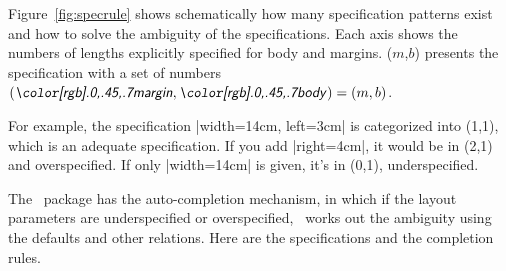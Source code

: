  Figure~\ref{fig:specrule} shows schematically how many specification
 patterns exist and how to solve the ambiguity of the
 specifications. Each axis shows the numbers of lengths
 explicitly specified for body and margins. \Ss($m$,$b$) presents the
 specification with a set of numbers $(\gpart{margin},\gpart{body})=(m,b)$.

 For example, the specification |width=14cm, left=3cm| is categorized
 into \Ss(1,1), which is an adequate specification. If you add
 |right=4cm|, it would be in \Ss(2,1) and overspecified. 
 If only |width=14cm| is given, it's in \Ss(0,1), underspecified. 

 The \Gm\ package has the auto-completion mechanism, in which
 if the layout parameters are underspecified or overspecified,
 \Gm\ works out the ambiguity using the defaults and other
 relations. Here are the specifications and the completion rules.

